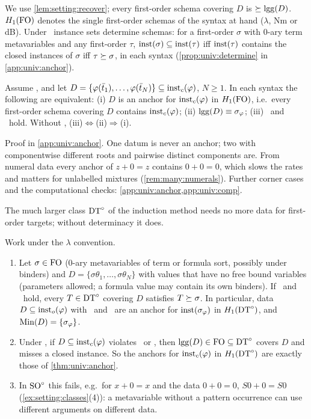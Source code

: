 We use \cref{lem:setting:recover}; every first-order schema covering $D$ is $\succeq\mathrm{lgg}(D)$. $H_{1}(\mathrm{FO})$ denotes the single first-order schemas of the syntax at hand ($\lambda$, Nm or dB). Under \univRich\ instance sets determine schemas: for a first-order $\sigma$ with $0$-ary term metavariables and any first-order $\tau$, $\mathrm{inst}(\sigma)\subseteq\mathrm{inst}(\tau)$ iff $\mathrm{inst}(\tau)$ contains the closed instances of $\sigma$ iff $\tau\succeq\sigma$, in each syntax (\cref{prop:univ:determine} in \cref{app:univ:anchor}).

\begin{theorem}\label{thm:univ:anchor}
Assume \univRich, and let $D=\{\varphi(\bar t_1),\dots,\varphi(\bar t_N)\}\subseteq\mathrm{inst}_{c}(\varphi)$, $N\ge1$. In each syntax the following are equivalent:
\textup{(i)} $D$ is an anchor for $\mathrm{inst}_{c}(\varphi)$ in $H_{1}(\mathrm{FO})$, i.e.\ every first-order schema covering $D$ contains $\mathrm{inst}_{c}(\varphi)$;
\textup{(ii)} $\mathrm{lgg}(D)\equiv\sigma_\varphi$;
\textup{(iii)} \evR\ and \evD\ hold.
Without \univRich, (iii)$\Leftrightarrow$(ii)$\Rightarrow$(i).
\end{theorem}

\noindent Proof in \cref{app:univ:anchor}. One datum is never an anchor; two with componentwise different roots and pairwise distinct components are. From numeral data every anchor of $z+0=z$ contains $0+0=0$, which slows the rates and matters for unlabelled mixtures (\cref{rem:many:numerals}). Further corner cases and the computational checks: \cref{app:univ:anchor,app:univ:comp}.

The much larger class $\mathrm{DT}^{\circ}$ of the induction method needs no more data for first-order targets; without determinacy it does.

\begin{proposition}\label{prop:univ:dt}
Work under the $\lambda$ convention.
\begin{enumerate}[label=(\alph*)]
\item Let $\sigma\in\mathrm{FO}$ (0-ary metavariables of term or formula sort, possibly under binders) and $D=\{\sigma\theta_1,\dots,\sigma\theta_N\}$ with values that have no free bound variables (parameters allowed; a formula value may contain its own binders). If \evR\ and \evD\ hold, every $T\in\mathrm{DT}^{\circ}$ covering $D$ satisfies $T\succeq\sigma$. In particular, data $D\subseteq\mathrm{inst}_{o}(\varphi)$ with \evR\ and \evD\ are an anchor for $\mathrm{inst}(\sigma_\varphi)$ in $H_{1}(\mathrm{DT}^{\circ})$, and $\mathrm{Min}(D)=\{\sigma_\varphi\}$.
\item Under \univRich, if $D\subseteq\mathrm{inst}_{c}(\varphi)$ violates \evR\ or \evD, then $\mathrm{lgg}(D)\in\mathrm{FO}\subseteq\mathrm{DT}^{\circ}$ covers $D$ and misses a closed instance. So the anchors for $\mathrm{inst}_{c}(\varphi)$ in $H_{1}(\mathrm{DT}^{\circ})$ are exactly those of \cref{thm:univ:anchor}.
\item In $\mathrm{SO}^{\circ}$ this fails, e.g.\ for $x+0=x$ and the data $0+0=0$, $S0+0=S0$ (\cref{ex:setting:classes}(4)): a metavariable without a pattern occurrence can use different arguments on different data.
\end{enumerate}
\end{proposition}

